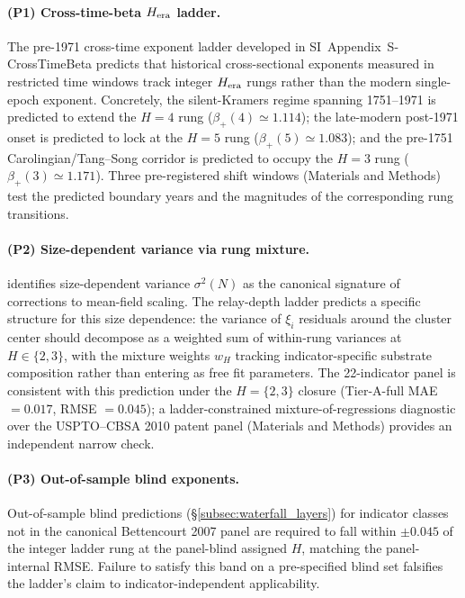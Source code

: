 \paragraph{(P1) Cross-time-beta $H_{\rm era}$ ladder.}
The pre-1971 cross-time exponent ladder developed in
SI~Appendix~S-CrossTimeBeta predicts that historical cross-sectional
exponents measured in restricted time windows track integer
$H_{\rm era}$ rungs rather than the modern single-epoch exponent.
Concretely, the silent-Kramers regime spanning 1751--1971 is predicted to extend
the $H{=}4$ rung ($\beta_+(4)\simeq 1.114$); the late-modern post-1971
onset is predicted to lock at the $H{=}5$ rung
($\beta_+(5)\simeq 1.083$); and the pre-1751
Carolingian/Tang--Song corridor is predicted to occupy the $H{=}3$ rung
($\beta_+(3)\simeq 1.171$). Three pre-registered shift windows
(Materials and Methods) test the predicted boundary years and the
magnitudes of the corresponding rung transitions.

\paragraph{(P2) Size-dependent variance via rung mixture.}
\citet{Bettencourt2020SciAdv} identifies size-dependent
variance $\sigma^2(N)$ as the canonical signature of corrections to
mean-field scaling. The relay-depth ladder predicts a specific structure
for this size dependence: the variance of $\xi_i$ residuals around the
cluster center should decompose as a weighted sum of within-rung
variances at $H\in\{2,3\}$, with the mixture weights $w_H$ tracking
indicator-specific substrate composition rather than entering as free
fit parameters. The 22-indicator panel is consistent with this
prediction under the $H{=}\{2,3\}$ closure (Tier-A-full MAE $=0.017$,
RMSE $=0.045$); a ladder-constrained mixture-of-regressions diagnostic
over the USPTO--CBSA 2010 patent panel (Materials and Methods)
provides an independent narrow check.

\paragraph{(P3) Out-of-sample blind exponents.}
Out-of-sample blind predictions (\S\ref{subsec:waterfall_layers})
for indicator classes not in the canonical Bettencourt 2007 panel are
required to fall within $\pm 0.045$ of the integer ladder rung at the
panel-blind assigned $H$, matching the panel-internal RMSE.
Failure to satisfy this band on a pre-specified blind set falsifies the
ladder's claim to indicator-independent applicability.

